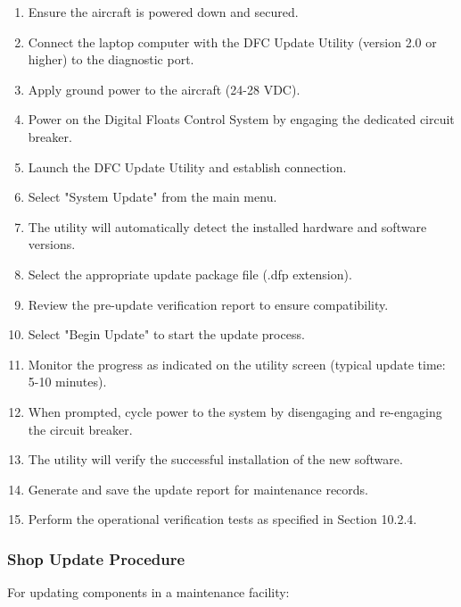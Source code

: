 \documentclass[12pt,a4paper,twoside,openright]{book}
\begin{document}
\begin{enumerate}
    \item Ensure the aircraft is powered down and secured.
    \item Connect the laptop computer with the DFC Update Utility (version 2.0 or higher) to the diagnostic port.
    \item Apply ground power to the aircraft (24-28 VDC).
    \item Power on the Digital Floats Control System by engaging the dedicated circuit breaker.
    \item Launch the DFC Update Utility and establish connection.
    \item Select "System Update" from the main menu.
    \item The utility will automatically detect the installed hardware and software versions.
    \item Select the appropriate update package file (.dfp extension).
    \item Review the pre-update verification report to ensure compatibility.
    \item Select "Begin Update" to start the update process.
    \item Monitor the progress as indicated on the utility screen (typical update time: 5-10 minutes).
    \item When prompted, cycle power to the system by disengaging and re-engaging the circuit breaker.
    \item The utility will verify the successful installation of the new software.
    \item Generate and save the update report for maintenance records.
    \item Perform the operational verification tests as specified in Section 10.2.4.
\end{enumerate}

\subsubsection{Shop Update Procedure}

For updating components in a maintenance facility:
\end{document}
